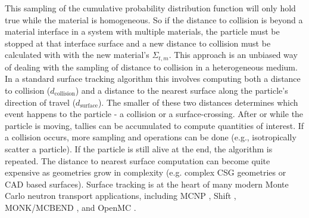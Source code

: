 This sampling of the cumulative probability distribution function will only hold true while the material is homogeneous.
So if the distance to collision is beyond a material interface in a system with multiple materials, the particle must be stopped at that interface surface and a new distance to collision must be calculated with with the new material's $\Sigma_{t,m}$.
This approach is an unbiased way of dealing with the sampling of distance to collision in a heterogeneous medium.
In a standard surface tracking algorithm this involves computing both a distance to collision ($d_{\text{collision}}$) and a distance to the nearest surface along the particle's direction of travel ($d_{\text{surface}}$).
The smaller of these two distances determines which event happens to the particle - a collision or a surface-crossing.
After or while the particle is moving, tallies can be accumulated to compute quantities of interest.
If a collision occurs, more sampling and operations can be done (e.g., isotropically scatter a particle).
If the particle is still alive at the end, the algorithm is repeated.
The distance to nearest surface computation can become quite expensive as geometries grow in complexity (e.g. complex CSG geometries or CAD based surfaces).
Surface tracking is at the heart of many modern Monte Carlo neutron transport applications, including MCNP \cite{MCNP_RisingArmstrongEtAl}, Shift \cite{hamilton_continuous-energy_2019, pandya_implementation_2016}, MONK/MCBEND \cite{richards_monk_2015}, and OpenMC \cite{romano_openmc_2015}.


